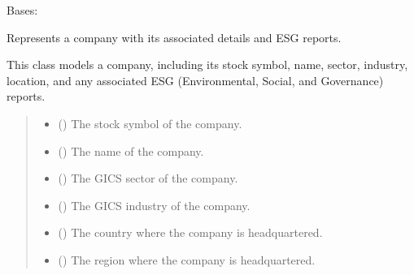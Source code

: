 \documentclass[letterpaper,10pt,english]{sphinxmanual}
\begin{document}
\begin{fulllineitems}
\label{\detokenize{src.data_models:src.data_models.company.Company}}
\pysigstartsignatures
\pysiglinewithargsret
{}
{}
{}
\pysigstopsignatures
\sphinxAtStartPar
Bases: 

\sphinxAtStartPar
Represents a company with its associated details and ESG reports.

\sphinxAtStartPar
This class models a company, including its stock symbol, name, sector, industry,
location, and any associated ESG (Environmental, Social, and Governance) reports.
\begin{quote}\begin{description}
\begin{itemize}
\item {} 
\sphinxAtStartPar
{} () \textendash{} The stock symbol of the company.

\item {} 
\sphinxAtStartPar
{} () \textendash{} The name of the company.

\item {} 
\sphinxAtStartPar
{} () \textendash{} The GICS sector of the company.

\item {} 
\sphinxAtStartPar
{} () \textendash{} The GICS industry of the company.

\item {} 
\sphinxAtStartPar
{} () \textendash{} The country where the company is headquartered.

\item {} 
\sphinxAtStartPar
{} () \textendash{} The region where the company is headquartered.


\end{itemize}
\end{description}
\end{quote}
\end{fulllineitems}
\end{document}
